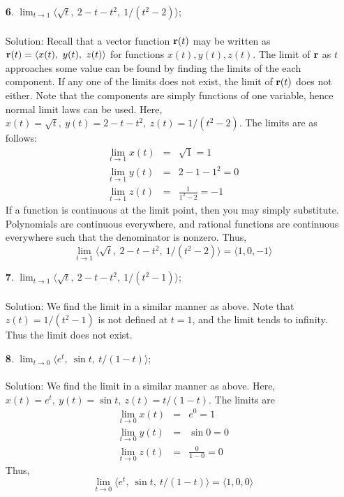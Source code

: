 \documentclass[12pt]{amsbook}
\newcommand{\la}{\langle}
\newcommand{\ra}{\rangle}
\begin{document}
\begin{enumerate}
  \item[{\small\bf 6}.] $\lim_{t \rightarrow 1}\la \sqrt{t}, \ 2-t-t^2, \ 1/(t^2-2)\ra$;
  \\
  \\
  {\sc Solution}: Recall that a vector function ${\bf r}(t)$ may be written as ${\bf r}(t)=\la x(t), \ y(t), \ z(t) \ra$ for functions $x(t), y(t), z(t)$. The limit of ${\bf r}$ as $t$ approaches some value can be found by finding the limits of the each component. If any one of the limits does not exist, the limit of ${\bf r}(t)$ does not either. Note that the components are simply functions of one variable, hence normal limit laws can be used. Here, $x(t)=\sqrt{t}, \ y(t)=2-t-t^2, \ z(t)=1/(t^2-2)$. The limits are as follows:
  \begin{eqnarray*}
\lim_{t\rightarrow 1}x(t)&=&\sqrt{1}=1\\
\lim_{t\rightarrow 1}y(t)&=&2-1-1^2=0\\
\lim_{t\rightarrow 1}z(t)&=&\frac{1}{1^2-2}=-1
  \end{eqnarray*}
If a function is continuous at the limit point, then you may simply substitute. Polynomials are continuous everywhere, and rational functions are continuous everywhere such that the denominator is nonzero. Thus, 
$$\lim_{t \rightarrow 1}\la \sqrt{t}, \ 2-t-t^2, \ 1/(t^2-2)\ra=\la 1,0,-1\ra $$
  \item[{\small\bf 7}.] $\lim_{t \rightarrow 1}\la \sqrt{t}, \ 2-t-t^2, \ 1/(t^2-1)\ra$;
  \\
  \\
  {\sc Solution}: We find the limit in a similar manner as above. Note that $z(t)=1/(t^2-1)$ is not defined at $t=1$, and the limit tends to infinity. Thus the limit does not exist.
  \\
  \item[{\small\bf 8}.] $\lim_{t \rightarrow 0}\la e^t, \ \sin t, \ t/(1-t) \ra$;
  \\
  \\
  {\sc Solution}: We find the limit in a similar manner as above. Here, $x(t)=e^t, \ y(t)=\sin t, \ z(t)=t/(1-t)$. The limits are 
    \begin{eqnarray*}
\lim_{t\rightarrow 0}x(t)&=&e^0=1\\
\lim_{t\rightarrow 0}y(t)&=&\sin 0=0\\
\lim_{t\rightarrow 0}z(t)&=&\frac{0}{1-0}=0
  \end{eqnarray*}
  Thus, 
$$\lim_{t \rightarrow 0}\la e^t, \ \sin t, \ t/(1-t) \ra=\la 1,0,0\ra $$

\end{enumerate}
\end{document}
